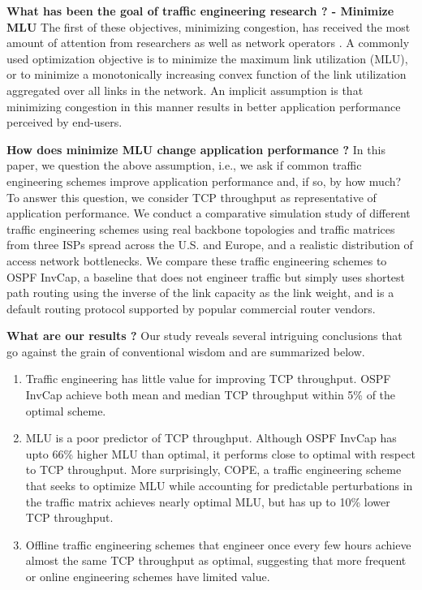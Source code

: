\textbf{What has been the goal of traffic engineering research ? - Minimize MLU}
The first of these objectives, minimizing congestion, has received the most amount of attention from researchers as well as network operators \cite{}. A commonly used optimization objective is to minimize the maximum link utilization (MLU), or to minimize a monotonically increasing convex function of the link utilization aggregated over all links in the network. An implicit assumption is that minimizing congestion in this manner results in better application performance perceived by end-users. %

\textbf{How does minimize MLU change application performance ?}
In this paper, we question the above assumption, i.e., we ask if common traffic engineering schemes improve application performance and, if so, by how much? To answer this question, we consider TCP throughput as representative of application performance. We conduct a comparative simulation study of different traffic engineering schemes using real backbone topologies and traffic matrices from three ISPs spread across the U.S. and Europe, and a realistic distribution of access network bottlenecks. We compare these traffic engineering schemes to OSPF InvCap, a baseline that does not engineer traffic but simply uses shortest path routing using the inverse of the link capacity as the link weight, and is a default routing protocol supported by popular commercial router vendors.

\textbf{What are our results ?}
Our study reveals several intriguing conclusions that go against the grain of conventional wisdom and are summarized below.

\begin{enumerate}
\item Traffic engineering has little value for improving TCP throughput. OSPF InvCap achieve both mean and median TCP throughput within 5\% of the optimal scheme.

\item MLU is a poor predictor of TCP throughput. Although OSPF InvCap has upto 66\% higher MLU than optimal, it performs close to optimal with respect to TCP throughput. More surprisingly, COPE, a traffic engineering scheme that seeks to optimize MLU while accounting for predictable perturbations in the traffic matrix achieves nearly optimal MLU, but has up to 10\% lower TCP throughput.

\item Offline traffic engineering schemes that engineer once every few hours achieve almost the same TCP throughput as optimal, suggesting that more frequent or online engineering schemes have limited value.

\end{enumerate}

